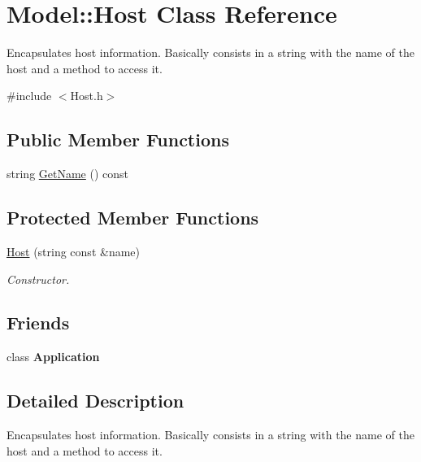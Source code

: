 \hypertarget{class_model_1_1_host}{\section{Model\-:\-:Host Class Reference}
\label{class_model_1_1_host}
}


Encapsulates host information. Basically consists in a string with the name of the host and a method to access it.  




{\ttfamily \#include $<$Host.\-h$>$}

\subsection*{Public Member Functions}
\begin{DoxyCompactItemize}
\item 
string \hyperlink{class_model_1_1_host_a07a8af83b24634cbc7b424fc355c012e}{Get\-Name} () const 
\end{DoxyCompactItemize}
\subsection*{Protected Member Functions}
\begin{DoxyCompactItemize}
\item 
\hypertarget{class_model_1_1_host_ac3b8dfe3fdddb3f9bec459f2d0a45528}{\hyperlink{class_model_1_1_host_ac3b8dfe3fdddb3f9bec459f2d0a45528}{Host} (string const \&name)}\label{class_model_1_1_host_ac3b8dfe3fdddb3f9bec459f2d0a45528}

\begin{DoxyCompactList}\small\item\em Constructor. \end{DoxyCompactList}\end{DoxyCompactItemize}
\subsection*{Friends}
\begin{DoxyCompactItemize}
\item 
\hypertarget{class_model_1_1_host_a23f25bcc02a0e94c2f5a4188496b04d0}{class {\bfseries Application}}\label{class_model_1_1_host_a23f25bcc02a0e94c2f5a4188496b04d0}

\end{DoxyCompactItemize}


\subsection{Detailed Description}
Encapsulates host information. Basically consists in a string with the name of the host and a method to access it. 

